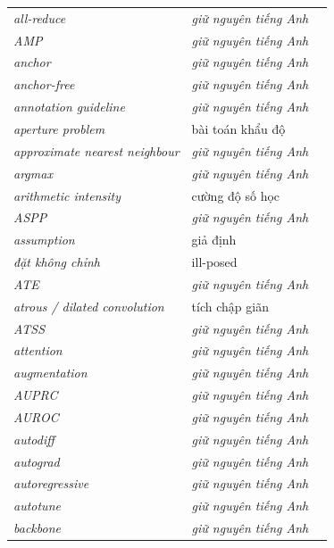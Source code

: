 \documentclass[deep_learning.tex]{subfiles}
\begin{document}
\begin{longtable}{@{}L{5.2cm}L{5.9cm}L{2.6cm}@{}}
\emph{all-reduce} & \emph{\color{tiercol}giữ nguyên tiếng Anh} & \\
\emph{AMP} & \emph{\color{tiercol}giữ nguyên tiếng Anh} & \\
\emph{anchor} & \emph{\color{tiercol}giữ nguyên tiếng Anh} & \\
\emph{anchor-free} & \emph{\color{tiercol}giữ nguyên tiếng Anh} & \\
\emph{annotation guideline} & \emph{\color{tiercol}giữ nguyên tiếng Anh} & \\
\emph{aperture problem} & bài toán khẩu độ & \\
\emph{approximate nearest neighbour} & \emph{\color{tiercol}giữ nguyên tiếng Anh} & \\
\emph{argmax} & \emph{\color{tiercol}giữ nguyên tiếng Anh} & \\
\emph{arithmetic intensity} & cường độ số học & \\
\emph{ASPP} & \emph{\color{tiercol}giữ nguyên tiếng Anh} & \\
\emph{assumption} & giả định & \\
\emph{đặt không chỉnh} & ill-posed & \\
\emph{ATE} & \emph{\color{tiercol}giữ nguyên tiếng Anh} & \\
\emph{atrous / dilated convolution} & tích chập giãn & \\
\emph{ATSS} & \emph{\color{tiercol}giữ nguyên tiếng Anh} & \\
\emph{attention} & \emph{\color{tiercol}giữ nguyên tiếng Anh} & \\
\emph{augmentation} & \emph{\color{tiercol}giữ nguyên tiếng Anh} & \\
\emph{AUPRC} & \emph{\color{tiercol}giữ nguyên tiếng Anh} & \\
\emph{AUROC} & \emph{\color{tiercol}giữ nguyên tiếng Anh} & \\
\emph{autodiff} & \emph{\color{tiercol}giữ nguyên tiếng Anh} & \\
\emph{autograd} & \emph{\color{tiercol}giữ nguyên tiếng Anh} & \\
\emph{autoregressive} & \emph{\color{tiercol}giữ nguyên tiếng Anh} & \\
\emph{autotune} & \emph{\color{tiercol}giữ nguyên tiếng Anh} & \\
\emph{backbone} & \emph{\color{tiercol}giữ nguyên tiếng Anh} & \\

\end{longtable}
\end{document}
